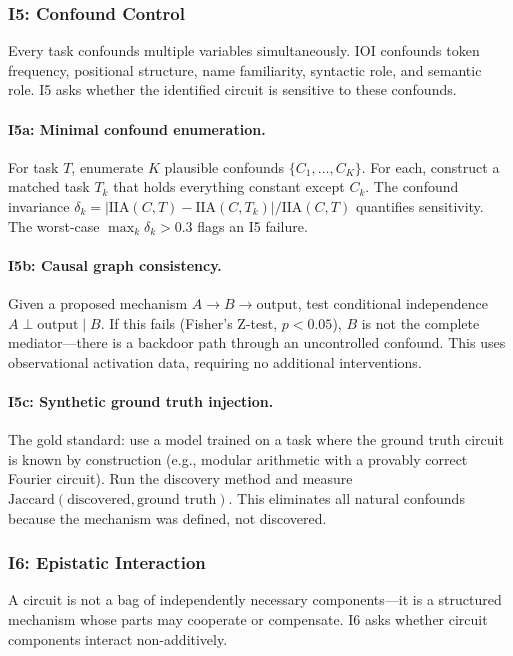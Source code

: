 \documentclass{article}
\begin{document}
\subsubsection{I5: Confound Control}

Every task confounds multiple variables simultaneously. IOI confounds token frequency, positional structure, name familiarity, syntactic role, and semantic role. I5 asks whether the identified circuit is sensitive to these confounds.

\paragraph{I5a: Minimal confound enumeration.} For task $T$, enumerate $K$ plausible confounds $\{C_1, \ldots, C_K\}$. For each, construct a matched task $T_k$ that holds everything constant except $C_k$. The confound invariance $\delta_k = |\text{IIA}(C, T) - \text{IIA}(C, T_k)| / \text{IIA}(C, T)$ quantifies sensitivity. The worst-case $\max_k \delta_k > 0.3$ flags an I5 failure.

\paragraph{I5b: Causal graph consistency.} Given a proposed mechanism $A \to B \to \text{output}$, test conditional independence $A \perp \text{output} \mid B$. If this fails (Fisher's Z-test, $p < 0.05$), $B$ is not the complete mediator---there is a backdoor path through an uncontrolled confound. This uses observational activation data, requiring no additional interventions.

\paragraph{I5c: Synthetic ground truth injection.} The gold standard: use a model trained on a task where the ground truth circuit is known by construction (e.g., modular arithmetic with a provably correct Fourier circuit). Run the discovery method and measure $\text{Jaccard}(\text{discovered}, \text{ground truth})$. This eliminates all natural confounds because the mechanism was defined, not discovered.

\subsubsection{I6: Epistatic Interaction}

A circuit is not a bag of independently necessary components---it is a structured mechanism whose parts may cooperate or compensate. I6 asks whether circuit components interact non-additively.
\end{document}
